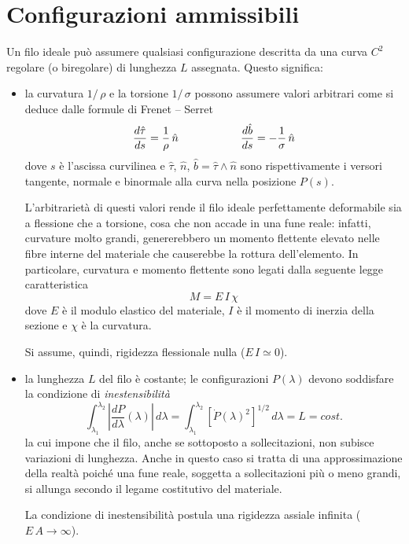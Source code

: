 \section*{Configurazioni ammissibili}
Un filo ideale può assumere qualsiasi configurazione descritta da una curva $C^2$ regolare (o biregolare) di lunghezza $L$ assegnata. Questo significa:
\begin{itemize}
	\item la curvatura $1/\,\rho$ e la torsione $1/\,\sigma$ possono assumere valori arbitrari come si deduce dalle formule di Frenet -- Serret
	\begin{equation*}
		\dfrac{d\hat{\tau}}{ds} = \dfrac{1}{\rho}\,\hat{n} \hspace*{2cm} \dfrac{d\hat{b}}{ds} = - \dfrac{1}{\sigma}\,\hat{n}
	\end{equation*}
	dove $s$ è l'ascissa curvilinea e $\hat{\tau}$, $\hat{n}$, $\hat{b} = \hat{\tau} \wedge \hat{n}$ sono rispettivamente i versori tangente, normale e binormale alla curva nella posizione $P(s)$.

	L'arbitrarietà di questi valori rende il filo ideale perfettamente deformabile sia a flessione che a torsione, cosa che non accade in una fune reale: infatti, curvature molto grandi, genererebbero un momento flettente elevato nelle fibre interne del materiale che causerebbe la rottura dell'elemento. In particolare, curvatura e momento flettente sono legati dalla seguente legge caratteristica
	\[
	M = E\,I\,\chi
	\]
	dove $E$ è il modulo elastico del materiale, $I$ è il momento di inerzia della sezione e $\chi$ è la curvatura.

	Si assume, quindi, rigidezza flessionale nulla ($E\,I\simeq 0$).
	\item la lunghezza $L$ del filo è costante; le configurazioni $P(\lambda)$ devono soddisfare la condizione di \emph{inestensibilità}
	\[
	\int_{\lambda_1}^{\lambda_2} \left| \dfrac{dP}{d\lambda}(\lambda) \right|\,d\lambda = \int_{\lambda_1}^{\lambda_2} [\dot{P}(\lambda)^2]^{1/2}\, d\lambda = L = cost.
	\]
	la cui impone che il filo, anche se sottoposto a sollecitazioni, non subisce variazioni di lunghezza. Anche in questo caso si tratta di una approssimazione della realtà poiché una fune reale, soggetta a sollecitazioni più o meno grandi, si allunga secondo il legame costitutivo del materiale.

	La condizione di inestensibilità postula una rigidezza assiale infinita ($E\,A \to \infty$).
\end{itemize}

